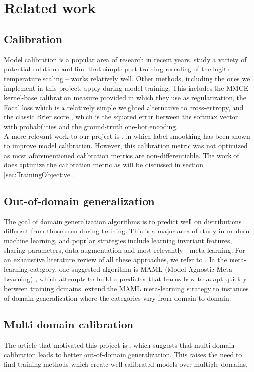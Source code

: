 \documentclass[12pt,a4paper]{article}
\begin{document}
\section{Related work}
\label{sec:RelatedWork}
\subsection*{Calibration}
\label{ssec:calibration}
Model calibration is a popular area of research in recent years. \cite{guo2017calibration} study a variety of potential solutions and find that simple post-training rescaling of the logits – temperature scaling – works relatively well. Other methods, including the ones we implement in this project, apply during model training. This includes the MMCE kernel-base calibration measure provided in \cite{kumar2018trainable} which they use as regularization, the Focal loss \citep{mukhoti2020calibrating} which is a relatively simple weighted alternative to cross-entropy, and the classic Brier score \citep{brier1950verification}, which is the squared error between the softmax vector with probabilities and the ground-truth one-hot encoding. \\
A more relevant work to our project is \cite{muller2019does}, in which label smoothing has been shown to improve model calibration. However, this calibration metric was not optimized as most aforementioned calibration metrics are non-differentiable. The work of \cite{bohdal2021meta} does optimize the calibration metric as will be discussed in section \ref{sec:TrainingObjective}.
\subsection*{Out-of-domain generalization}
\label{ssec:ood-gen}
The goal of domain generalization algorithms is to predict well on distributions different from those seen during training. This is a major area of study in modern machine learning, and popular strategies include learning invariant features, sharing parameters, data augmentation and most relevantly - meta learning. For an exhaustive literature review of all these approaches, we refer to \cite{gulrajani2020search}. In the meta-learning category, one suggested algorithm is MAML (Model-Agnostic Meta-Learning) \citep{finn2017model}, which attempts to build a predictor that learns how to adapt quickly between training domains. \cite{li2019feature} extend the MAML meta-learning strategy to instances of domain generalization where the categories vary from domain to domain.
\subsection*{Multi-domain calibration}
\label{ssec:multi-domain-calibration}
The article that motivated this project is \cite{wald2021calibration}, which suggests that multi-domain calibration leads to better out-of-domain generalization. This raises the need to find training methods which create well-calibrated models over multiple domains.
\end{document}

